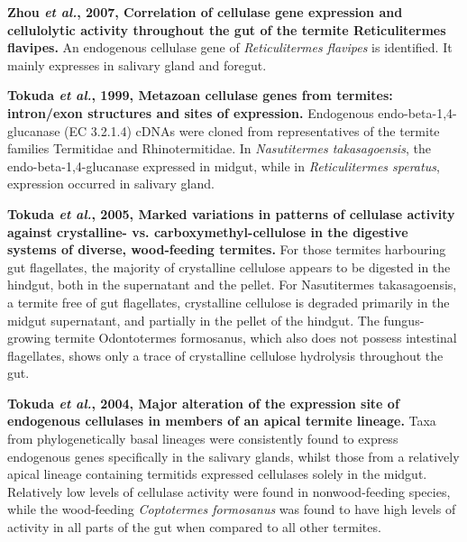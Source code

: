 \documentclass[11pt]{article}
\begin{document}
\begin{sloppypar}
\par
\textbf{Zhou \textit{et al.}, 2007, Correlation of cellulase gene expression and cellulolytic activity throughout the gut of the termite Reticulitermes flavipes.} \newline
An endogenous cellulase gene of \textit{Reticulitermes flavipes} is identified. 
It mainly expresses in salivary gland and foregut. 
\par
\textbf{Tokuda \textit{et al.}, 1999, Metazoan cellulase genes from termites: intron/exon structures and sites of expression.} \newline
Endogenous endo-beta-1,4-glucanase (EC 3.2.1.4) cDNAs were cloned from representatives of the termite families Termitidae and Rhinotermitidae. 
In \textit{Nasutitermes takasagoensis}, the endo-beta-1,4-glucanase expressed in midgut, while in \textit{Reticulitermes speratus}, expression occurred in salivary gland. 
\par
\textbf{Tokuda \textit{et al.}, 2005, Marked variations in patterns of cellulase activity against crystalline- vs. carboxymethyl-cellulose in the digestive systems of diverse, wood-feeding termites.} \newline
For those termites harbouring gut flagellates, the majority of crystalline cellulose appears to be digested in the hindgut, both in the supernatant and the pellet. For Nasutitermes takasagoensis, a termite free of gut flagellates, crystalline cellulose is degraded primarily in the midgut supernatant, and partially in the pellet of the hindgut. The fungus-growing termite Odontotermes formosanus, which also does not possess intestinal flagellates, shows only a trace of crystalline cellulose hydrolysis throughout the gut. 
\par
\textbf{Tokuda \textit{et al.}, 2004, Major alteration of the expression site of endogenous cellulases in members of an apical termite lineage.} \newline
Taxa from phylogenetically basal lineages were consistently found to express endogenous genes specifically in the salivary glands, whilst those from a relatively apical lineage containing termitids expressed cellulases solely in the midgut. 
Relatively low levels of cellulase activity were found in nonwood-feeding species, while the wood-feeding \textit{Coptotermes formosanus} was found to have high levels of activity in all parts of the gut when compared to all other termites.
\par



\end{sloppypar}
\end{document}
